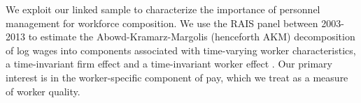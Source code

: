  


We exploit our linked sample to characterize the importance of personnel management for workforce composition. We use the RAIS panel between 2003-2013 to estimate the Abowd-Kramarz-Margolis (henceforth AKM) decomposition of log wages into components associated with time-varying worker characteristics, a time-invariant firm effect and a time-invariant worker effect \citep{Abowd1999}. Our primary interest is in the worker-specific component of pay, which we treat as a measure of worker quality. 

